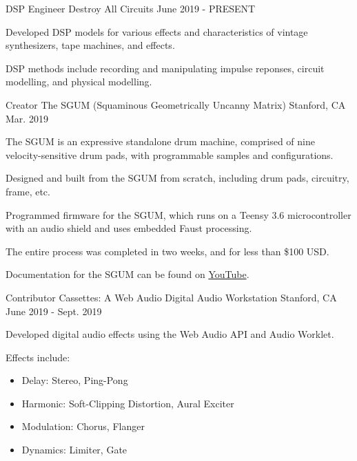 \begin{cventries}
    \cventry
    {DSP Engineer} %
    {Destroy All Circuits} %
    {} %
    {June 2019 - PRESENT} %
    {
      \begin{cvitems} %
        \item {Developed DSP models for various effects and characteristics of vintage synthesizers, tape machines, and effects.}
        \item {DSP methods include recording and manipulating impulse reponses, circuit modelling, and physical modelling.}
      \end{cvitems}
    }

    \cventry
    {Creator} %
    {The SGUM (Squaminous Geometrically Uncanny Matrix)} %
    {Stanford, CA} %
    {Mar. 2019} %
    {
      \begin{cvitems} %
        \item {The SGUM is an expressive standalone drum machine, comprised of nine velocity-sensitive drum pads, with programmable samples and configurations.}
        \item {Designed and built from the SGUM from scratch, including drum pads, circuitry, frame, etc.}
        \item {Programmed firmware for the SGUM, which runs on a Teensy 3.6 microcontroller with an audio shield and uses embedded Faust processing.}
        \item {The entire process was completed in two weeks, and for less than \$100 USD.}
        \item {Documentation for the SGUM can be found on \href{https://www.youtube.com/watch?v=NOcPRS4LxpQ}{YouTube}.}
      \end{cvitems}
    }

    \cventry
    {Contributor} %
    {Cassettes: A Web Audio Digital Audio Workstation} %
    {Stanford, CA} %
    {June 2019 - Sept. 2019} %
    {
      \begin{cvitems} %
        \item {Developed digital audio effects using the Web Audio API and Audio Worklet.}
        \item {Effects include:}
        \begin{itemize}
            \item {Delay: Stereo, Ping-Pong}
            \item {Harmonic: Soft-Clipping Distortion, Aural Exciter}
            \item {Modulation: Chorus, Flanger}
            \item {Dynamics: Limiter, Gate}
        \end{itemize}
      \end{cvitems}
    }


\end{cventries}
